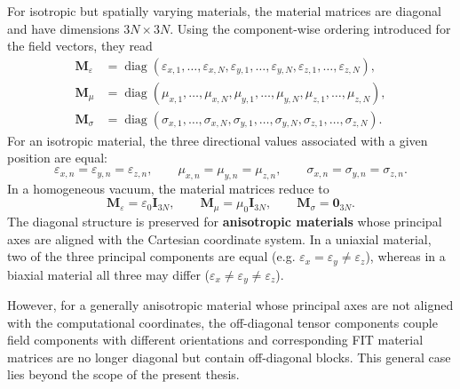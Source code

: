 For isotropic but spatially varying materials, the material matrices are diagonal and have dimensions $3N\times3N$. Using the component-wise ordering introduced for the field vectors, they read
%
\begin{equation}
\begin{aligned}
\mathbf{M}_{\varepsilon}
&=
\operatorname{diag}
\left(
\varepsilon_{x,1},\ldots,\varepsilon_{x,N},
\varepsilon_{y,1},\ldots,\varepsilon_{y,N},
\varepsilon_{z,1},\ldots,\varepsilon_{z,N}
\right),
\\
\mathbf{M}_{\mu}
&=
\operatorname{diag}
\left(
\mu_{x,1},\ldots,\mu_{x,N},
\mu_{y,1},\ldots,\mu_{y,N},
\mu_{z,1},\ldots,\mu_{z,N}
\right),
\\
\mathbf{M}_{\sigma}
&=
\operatorname{diag}
\left(
\sigma_{x,1},\ldots,\sigma_{x,N},
\sigma_{y,1},\ldots,\sigma_{y,N},
\sigma_{z,1},\ldots,\sigma_{z,N}
\right).
\end{aligned}
\label{eq:diagonal_material_matrices}
\end{equation}
%
For an isotropic material, the three directional values associated with a given position are equal:
%
\begin{equation}
\varepsilon_{x,n}
=
\varepsilon_{y,n}
=
\varepsilon_{z,n},
\qquad
\mu_{x,n}
=
\mu_{y,n}
=
\mu_{z,n},
\qquad
\sigma_{x,n}
=
\sigma_{y,n}
=
\sigma_{z,n}.
\label{eq:isotropic_material_components}
\end{equation}
%
In a homogeneous vacuum, the material matrices reduce to
%
\begin{equation}
\mathbf{M}_{\varepsilon}
=
\varepsilon_0\mathbf{I}_{3N},
\qquad
\mathbf{M}_{\mu}
=
\mu_0\mathbf{I}_{3N},
\qquad
\mathbf{M}_{\sigma}
=
\mathbf{0}_{3N}.
\label{eq:vacuum_material_matrices}
\end{equation}
%
The diagonal structure is preserved for \textbf{anisotropic materials} whose principal axes are aligned with the Cartesian coordinate system. In a uniaxial material, two of the three principal components are equal (e.g. $\varepsilon_x=\varepsilon_y\neq\varepsilon_z$), whereas in a biaxial material all three may differ ($\varepsilon_x\neq\varepsilon_y\neq\varepsilon_z$). 

However, for a generally anisotropic material whose principal axes are not aligned with the computational coordinates, the off-diagonal tensor components couple field components with different orientations and corresponding FIT material matrices are no longer diagonal but contain off-diagonal blocks. This general case lies beyond the scope of the present thesis.


